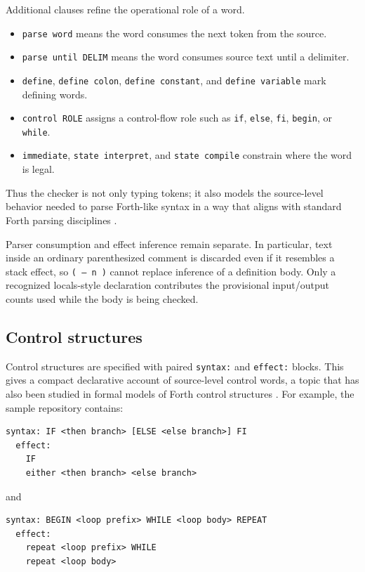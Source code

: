\documentclass[11pt]{article}
\begin{document}
Additional clauses refine the operational role of a word.
\begin{itemize}
\item \texttt{parse word} means the word consumes the next token from the source.
\item \texttt{parse until DELIM} means the word consumes source text until a delimiter.
\item \texttt{define}, \texttt{define colon}, \texttt{define constant}, and \texttt{define variable} mark defining words.
\item \texttt{control ROLE} assigns a control-flow role such as \texttt{if}, \texttt{else}, \texttt{fi}, \texttt{begin}, or \texttt{while}.
\item \texttt{immediate}, \texttt{state interpret}, and \texttt{state compile} constrain where the word is legal.
\end{itemize}

Thus the checker is not only typing tokens; it also models the source-level behavior needed to parse Forth-like syntax in a way that aligns with standard Forth parsing disciplines \cite{forth2012standard}.

Parser consumption and effect inference remain separate. In particular, text
inside an ordinary parenthesized comment is discarded even if it resembles a
stack effect, so \texttt{( -- n )} cannot replace inference of a definition
body. Only a recognized locals-style declaration contributes the provisional
input/output counts used while the body is being checked.

\subsection{Control structures}
Control structures are specified with paired \texttt{syntax:} and \texttt{effect:} blocks. This gives a compact declarative account of source-level control words, a topic that has also been studied in formal models of Forth control structures \cite{power2004formal}. For example, the sample repository contains:
\begin{lstlisting}
syntax: IF <then branch> [ELSE <else branch>] FI
  effect:
    IF
    either <then branch> <else branch>
\end{lstlisting}

and
\begin{lstlisting}
syntax: BEGIN <loop prefix> WHILE <loop body> REPEAT
  effect:
    repeat <loop prefix> WHILE
    repeat <loop body>
\end{lstlisting}
\end{document}
